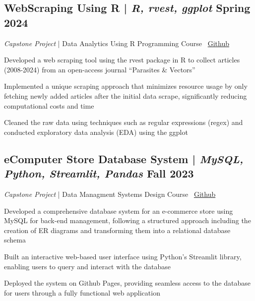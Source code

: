

\subsection{WebScraping Using R \textnormal{ | \textit{R, rvest, ggplot} \hfill Spring 2024}}
\textit{Capstone Project} | Data Analytics Using R Programming Course \hfill \faCodeFork\ \href{https://github.com/vinay-ram1999/WebScraping-R}{Github}
\begin{zitemize}
    \item Developed a web scraping tool using the rvest package in R to collect articles (2008-2024) from an open-access journal ``Parasites \& Vectors''
    \item Implemented a unique scraping approach that minimizes resource usage by only fetching newly added articles after the initial data scrape, significantly reducing computational costs and time
    \item Cleaned the raw data using techniques such as regular expressions (regex) and conducted exploratory data analysis (EDA) using the ggplot
\end{zitemize}


\subsection{eComputer Store Database System \textnormal{ | \textit{MySQL, Python, Streamlit, Pandas} \hfill Fall 2023}}
\textit{Capstone Project} | Data Managment Systems Design Course \hfill \faCodeFork\ \href{https://github.com/vinay-ram1999/CS631-DMSD}{Github}
\begin{zitemize}
    \item Developed a comprehensive database system for an e-commerce store using MySQL for back-end management, following a structured approach including the creation of ER diagrams and transforming them into a relational database schema
    \item Built an interactive web-based user interface using Python's Streamlit library, enabling users to query and interact with the database
    \item Deployed the system on Github Pages, providing seamless access to the database for users through a fully functional web application
\end{zitemize}



